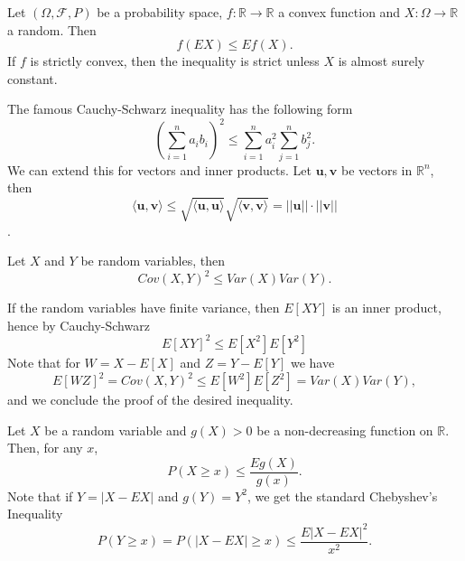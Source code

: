 \begin{theorem}
	Let $(\Omega, \mathcal F, P)$ be a probability space, $f:\mathbb R \to \mathbb R$
	a convex function and $X:\Omega \to \mathbb R$ a random. Then
	\begin{equation}
		f(EX) \leq E f(X).
	\end{equation}
	If $f$ is strictly convex, then the inequality is strict unless
	$X$ is almost surely constant.
\end{theorem}

\begin{theorem}
	The famous Cauchy-Schwarz inequality has the following form
	\begin{equation}
		\left(\sum_{i=1}^n a_i b_i\right)^2 \leq \sum_{i=1}^n a_i^2 \sum_{j=1}^n b_j^2.
	\end{equation}
	We can extend this for vectors and inner products. Let $\bm u, \bm v$ be vectors
	in $\mathbb R^n$, then
	\begin{equation}
		\langle \bm u, \bm v \rangle \leq
		\sqrt{\langle \bm u, \bm u \rangle}
		\sqrt{\langle \bm v, \bm v \rangle} =
		||\bm u ||\cdot || \bm v ||
	\end{equation}.
\end{theorem}

\begin{theorem}
	Let $X$ and $Y$ be random variables, then
	\begin{equation}
		Cov(X,Y)^2 \leq Var(X) Var(Y).
	\end{equation}
\end{theorem}
\begin{prf}
	If the random variables have finite variance, then $E[XY]$ is an inner product,
	hence by Cauchy-Schwarz
	\begin{equation*}
		E[XY]^2 \leq E[X^2]E[Y^2]
	\end{equation*}
	Note that for $W = X - E[X]$ and $Z = Y - E[Y]$ we have
	\begin{equation*}
		E[WZ]^2 = Cov(X,Y)^2 \leq E[W^2]E[Z^2] = Var(X)Var(Y),
	\end{equation*}
	and we conclude the proof of the desired inequality.
\end{prf}

\begin{theorem}
	Let $X$ be a random variable and $g(X)>0$  be a non-decreasing
	function on $\mathbb R$. Then, for any $x$,
	\begin{equation}
		P(X \geq x) \leq \frac{E g(X)}{g(x)}.
	\end{equation}
	Note that if $Y = |X - EX|$ and $g(Y) = Y^2$, we get the standard Chebyshev's Inequality
	\begin{equation}
		P(Y \geq x)= P(|X - EX| \geq x) \leq \frac{E |X - EX|^2}{x^2}.
	\end{equation}
\end{theorem}

